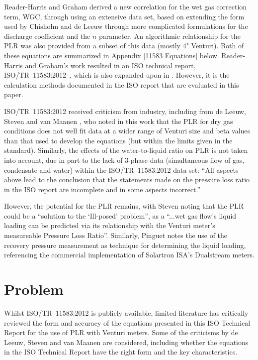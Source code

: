 \documentclass[journal]{IEEEtran}
\begin{document}
Reader-Harris and Graham \cite{Reader-Harris2009} derived a new correlation for the wet gas correction term, \acrshort{WGC}, through using an extensive data set, based on extending the form used by Chisholm \cite{Chisholm1977} and de Leeuw \cite{DeLeeuw1997} through more complicated formulations for the discharge coefficient and the $n$ parameter.  An algorithmic relationship for the \acrshort{PLR} was also provided from a subset of this data (mostly 4" Venturi).  Both of these equations are summarized in Appendix \ref{11583 Equations} below. Reader-Harris and Graham's work resulted in an ISO technical report, ISO/TR~11583:2012~\cite{2003ISOTubes}, which is also expanded upon in \cite{Reader-Harris2015}.  However, it is the calculation methods documented in the ISO report that are evaluated in this paper.

ISO/TR~11583:2012 received criticism from industry, including from de Leeuw, Steven and van Maanen \cite{DeLeeuw2011}, who noted in this work that the \acrlong{PLR} for dry gas conditions does not well fit data at a wider range of Venturi size and \acrshort{beta} values than that used to develop the equations (but within the limits given in the standard).  Similarly, the effects of the water-to-liquid ratio on  \acrshort{PLR} is not taken into account, due in part to the lack of 3-phase data (simultaneous flow of gas, condensate and water) within the ISO/TR~11583:2012 data set: ``All aspects above lead to the conclusion that the statements made on the pressure loss ratio in the ISO report are incomplete and in some aspects incorrect.'' 

However, the potential for the \acrlong{PLR} remains, with Steven \cite{Steven2018OrificeProblem} noting that the \acrshort{PLR} could be a ``solution to the `Ill-posed' problem'', as a ``...wet gas flow’s liquid loading can be predicted via its relationship with the Venturi meter’s measureable Pressure Loss Ratio''.  Similarly, Pinguet \cite{Pinguet2018ExtensiveConditions} notes the use of the recovery pressure measurement as technique for determining the liquid loading, referencing the commercial implementation of Solartron ISA's Dualstream meters.

\section{Problem}

Whilst ISO/TR~11583:2012 is publicly available, limited literature has critically reviewed the form and accuracy of the equations presented in this ISO Technical Report for the use of \acrlong{PLR} with Venturi meters.  Some of the criticisms by de Leeuw, Steven and van Maanen \cite{DeLeeuw2011} are considered, including whether the equations in the ISO Technical Report have the right form and the key characteristics.
\end{document}
